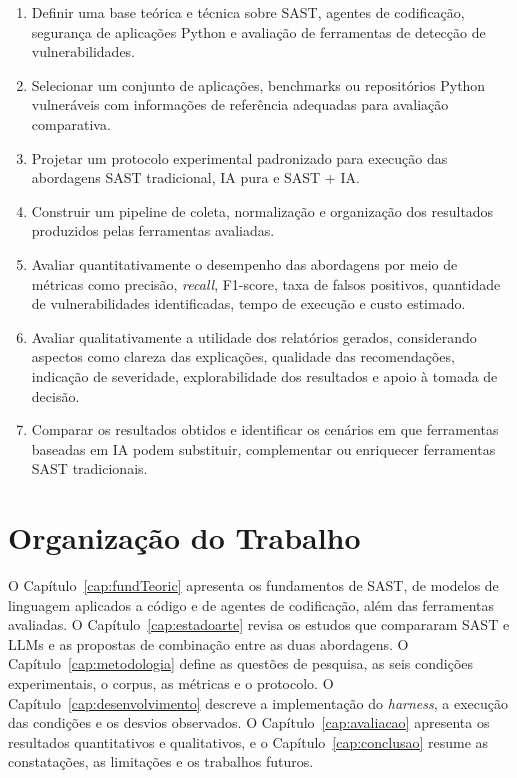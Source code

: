 \begin{enumerate}
    \item Definir uma base teórica e técnica sobre SAST, agentes de codificação, segurança de aplicações Python e avaliação de ferramentas de detecção de vulnerabilidades.

    \item Selecionar um conjunto de aplicações, benchmarks ou repositórios Python vulneráveis com informações de referência adequadas para avaliação comparativa.

    \item Projetar um protocolo experimental padronizado para execução das abordagens SAST tradicional, IA pura e SAST + IA.

    \item Construir um pipeline de coleta, normalização e organização dos resultados produzidos pelas ferramentas avaliadas.

    \item Avaliar quantitativamente o desempenho das abordagens por meio de métricas como precisão, \textit{recall}, F1-score, taxa de falsos positivos, quantidade de vulnerabilidades identificadas, tempo de execução e custo estimado.

    \item Avaliar qualitativamente a utilidade dos relatórios gerados, considerando aspectos como clareza das explicações, qualidade das recomendações, indicação de severidade, explorabilidade dos resultados e apoio à tomada de decisão.

    \item Comparar os resultados obtidos e identificar os cenários em que ferramentas baseadas em IA podem substituir, complementar ou enriquecer ferramentas SAST tradicionais.
\end{enumerate}

\section{Organização do Trabalho}\label{sec:organizacao-trabalho}

O Capítulo~\ref{cap:fundTeoric} apresenta os fundamentos de SAST, de modelos de linguagem aplicados a código e de agentes de codificação, além das ferramentas avaliadas. O Capítulo~\ref{cap:estadoarte} revisa os estudos que compararam SAST e LLMs e as propostas de combinação entre as duas abordagens. O Capítulo~\ref{cap:metodologia} define as questões de pesquisa, as seis condições experimentais, o corpus, as métricas e o protocolo. O Capítulo~\ref{cap:desenvolvimento} descreve a implementação do \textit{harness}, a execução das condições e os desvios observados. O Capítulo~\ref{cap:avaliacao} apresenta os resultados quantitativos e qualitativos, e o Capítulo~\ref{cap:conclusao} resume as constatações, as limitações e os trabalhos futuros.
